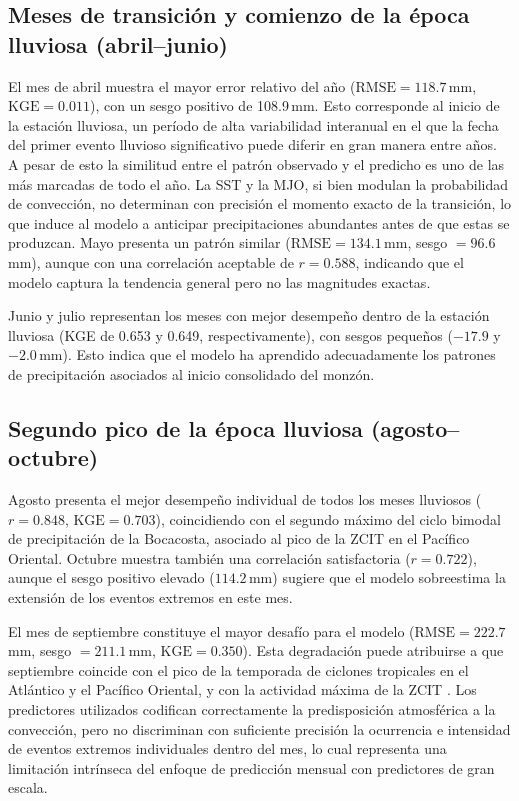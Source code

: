 \subsection*{Meses de transición y comienzo de la época lluviosa (abril--junio)}

El mes de abril muestra el mayor error relativo del año ($\text{RMSE} = 118.7$\,mm,
$\text{KGE} = 0.011$), con un sesgo positivo de 108.9\,mm. Esto corresponde al inicio
de la estación lluviosa, un período de alta variabilidad interanual en el que la fecha
del primer evento lluvioso significativo puede diferir en gran manera entre años. A pesar de
esto la similitud entre el patrón observado y el predicho es uno de las más marcadas de todo
el año.  La SST y la MJO, si bien modulan la probabilidad de convección, no determinan con precisión
el momento exacto de la transición, lo que induce al modelo a anticipar precipitaciones
abundantes antes de que estas se produzcan. Mayo presenta un patrón similar
($\text{RMSE} = 134.1$\,mm, sesgo $= 96.6$\,mm), aunque con una correlación aceptable
de $r = 0.588$, indicando que el modelo captura la tendencia general pero no
las magnitudes exactas.

Junio y julio representan los meses con mejor desempeño dentro de la estación lluviosa
(KGE de 0.653 y 0.649, respectivamente), con sesgos pequeños ($-17.9$ y $-2.0$\,mm).
Esto indica que el modelo ha aprendido adecuadamente los patrones de precipitación
asociados al inicio consolidado del monzón. %

\subsection*{Segundo pico de la época lluviosa (agosto--octubre)}

Agosto presenta el mejor desempeño individual de todos los meses lluviosos
($r = 0.848$, $\text{KGE} = 0.703$), coincidiendo con el segundo máximo del ciclo
bimodal de precipitación de la Bocacosta, asociado al pico de la ZCIT en el Pacífico
Oriental. Octubre muestra también una correlación satisfactoria ($r = 0.722$), aunque
el sesgo positivo elevado ($114.2$\,mm) sugiere que el modelo sobreestima la extensión
de los eventos extremos en este mes.

El mes de septiembre constituye el mayor desafío para el modelo ($\text{RMSE} =
222.7$\,mm, sesgo $= 211.1$\,mm, $\text{KGE} = 0.350$). Esta degradación puede
atribuirse a que septiembre coincide con el pico de la temporada de ciclones tropicales
en el Atlántico y el Pacífico Oriental, y con la actividad máxima de la ZCIT
\cite{herrera2017descripcion}.
Los predictores utilizados codifican correctamente la predisposición atmosférica a la
convección, pero no discriminan con suficiente precisión la ocurrencia e
intensidad de eventos extremos individuales dentro del mes, lo cual representa una
limitación intrínseca del enfoque de predicción mensual con predictores de gran escala.

